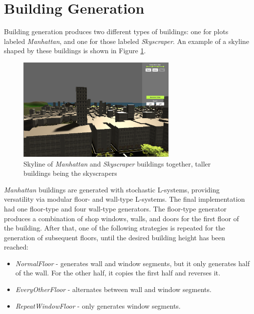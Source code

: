 \section{Building Generation}


Building generation produces two different types of buildings: one for plots labeled \textit{Manhattan}, and one for those labeled \textit{Skyscraper}. 
An example of a skyline shaped by these buildings is shown in Figure \ref{fig:skyline-result}.

\begin{figure}[H]
  \centering

  \includegraphics[width=0.7\textwidth]{figure/skyline.PNG}
  \caption{Skyline of \textit{Manhattan} and \textit{Skyscraper} buildings together, taller buildings being the skyscrapers}

  \label{fig:skyline-result}
\end{figure}

\textit{Manhattan} buildings are generated with stochastic L-systems, providing versatility via modular floor- and wall-type L-systems.
The final implementation had one floor-type and four wall-type generators.
The floor-type generator produces a combination of shop windows, walls, and doors for the first floor of the building.
After that, one of the following strategies is repeated for the generation of subsequent floors, until the desired building height has been reached:

\begin{itemize}
  \item \textit{NormalFloor} - generates wall and window segments, but it only generates half of the wall. For the other half, it copies the first half and reverses it. 
  \item \textit{EveryOtherFloor} - alternates between wall and window segments.
  \item \textit{RepeatWindowFloor} - only generates window segments.
\end{itemize}

